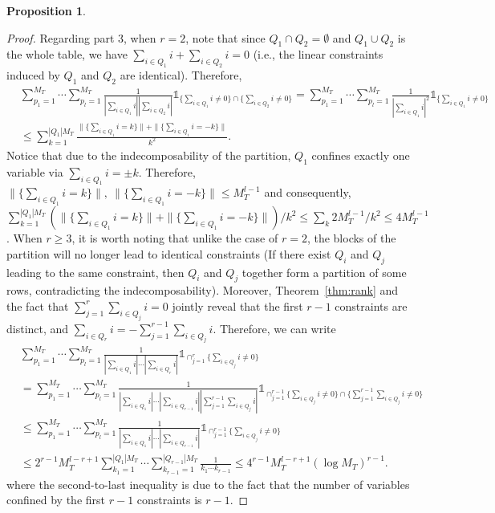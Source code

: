 \documentclass[11pt]{article}
\numberwithin{equation}{section}
\theoremstyle{plain}
\theoremstyle{definition}
\theoremstyle{definition}
\theoremstyle{assumption}
\theoremstyle{proposition}
\newtheorem{proposition}{Proposition}[section]
\theoremstyle{proposition}
\theoremstyle{example}
\theoremstyle{lemma}
\theoremstyle{theorem}
\theoremstyle{remark}
\begin{document}
\begin{proposition}
\begin{proof}
Regarding part 3, when $r=2$, note that since $Q_1\cap Q_2 = \emptyset$ and $Q_1\cup Q_2$ is the whole table, we have $\sum_{i\in Q_1} i + \sum_{i\in Q_2} i = 0$ (i.e., the linear constraints induced by $Q_1$ and $Q_2$ are identical). Therefore,
\begin{align*}
&\sum_{p_1=1}^{M_T}\cdots\sum_{p_l=1}^{M_T}\frac{1}{|\sum_{i\in Q_1} i| |\sum_{i\in Q_2} i|}\mathds{1}_{\{\sum_{i\in Q_1} i \neq 0\}\cap\{\sum_{i\in Q_2} i \neq 0\}}
=\sum_{p_1=1}^{M_T}\cdots\sum_{p_l=1}^{M_T}\frac{1}{|\sum_{i\in Q_1} i|^2}\mathds{1}_{\{\sum_{i\in Q_1} i \neq 0\}} \\
&\leqslant\sum_{k=1}^{|Q_1| M_T}\frac{\|\{\sum_{i\in Q_1} i = k\}\| + \|\{\sum_{i\in Q_1} i = -k\}\|}{k^2}.
\end{align*}
Notice that due to the indecomposability of the partition, $Q_1$ confines exactly one variable via $\sum_{i\in Q_1} i = \pm k$. Therefore, $\|\{\sum_{i\in Q_1} i = k\}\|,~\|\{\sum_{i\in Q_1} i = -k\}\|\leqslant M_T^{l-1}$ and consequently, $\sum_{k=1}^{|Q_1| M_T}(\|\{\sum_{i\in Q_1} i = k\}\| + \|\{\sum_{i\in Q_1} i = -k\}\|)/k^2\leqslant \sum_{k}2M_T^{l-1}/k^2 \leqslant 4 M_T^{l-1}$. When $r\geqslant 3$, it is worth noting that unlike the case of $r=2$, the blocks of the partition will no longer lead to identical constraints (If there exist $Q_i$ and $Q_j$ leading to the same constraint, then $Q_i$ and $Q_j$ together form a partition of some rows, contradicting the indecomposability). Moreover, Theorem~\ref{thm:rank} and the fact that $\sum_{j=1}^r\sum_{i\in Q_j}i = 0$ jointly reveal that the first $r - 1$ constraints are distinct, and $\sum_{i\in Q_r}i = -\sum_{j=1}^{r-1}\sum_{i\in Q_j}i$. Therefore, we can write
\begin{align*}
&\sum_{p_1=1}^{M_T}\cdots\sum_{p_l=1}^{M_T}\frac{1}{|\sum_{i\in Q_1} i|\cdots|\sum_{i\in Q_r} i|}\mathds{1}_{\cap_{j=1}^r\{\sum_{i\in Q_j} i \neq 0\}} \\
&=\sum_{p_1=1}^{M_T}\cdots\sum_{p_l=1}^{M_T}\frac{1}{|\sum_{i\in Q_1} i|\cdots|\sum_{i\in Q_{r-1}}i||\sum_{j=1}^{r-1}\sum_{i\in Q_j}i|}\mathds{1}_{\cap_{j=1}^{r-1}\{\sum_{i\in Q_j} i \neq 0\}\cap\{\sum_{j=1}^{r-1}\sum_{i\in Q_j}i\neq 0\}} \\
&\leqslant \sum_{p_1=1}^{M_T}\cdots\sum_{p_l=1}^{M_T}\frac{1}{|\sum_{i\in Q_1} i|\cdots|\sum_{i\in Q_{r-1}}i|}\mathds{1}_{\cap_{j=1}^{r-1}\{\sum_{i\in Q_j} i \neq 0\}} \\
&\leqslant 2^{r-1}M_T^{l-r+1}\sum_{k_1=1}^{|Q_1| M_T}\cdots\sum_{k_{r-1}=1}^{|Q_{r-1}|M_T}\frac{1}{k_1\cdots k_{r-1}}
\leqslant 4^{r-1} M_T^{l-r+1}(\log M_T)^{r-1} .    
\end{align*}
where the second-to-last inequality is due to the fact that the number of variables confined by the first $r-1$ constraints is $r-1$.



\end{proof}
\end{proposition}
\end{document}
